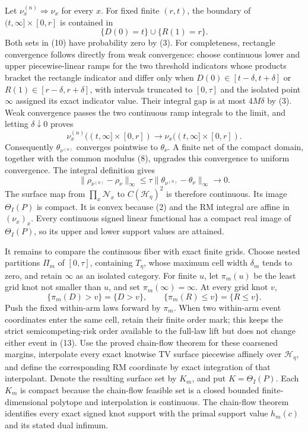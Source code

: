 Let \(\nu_x^{(n)}\Rightarrow\nu_x\) for every \(x\).  For fixed finite \((r,t)\), the boundary of \((t,\infty]\times[0,r]\) is contained in
\[
 \{D(0)=t\}\cup\{R(1)=r\}. \tag{10}
\]
Both sets in (10) have probability zero by (3).  For completeness, rectangle convergence follows directly from weak convergence: choose continuous lower and upper piecewise-linear ramps for the two threshold indicators whose products bracket the rectangle indicator and differ only when \(D(0)\in[t-\delta,t+\delta]\) or \(R(1)\in[r-\delta,r+\delta]\), with intervals truncated to \([0,\tau]\) and the isolated point \(\infty\) assigned its exact indicator value.  Their integral gap is at most \(4M\delta\) by (3).  Weak convergence passes the two continuous ramp integrals to the limit, and letting \(\delta\downarrow0\) proves
\[
 \nu_x^{(n)}((t,\infty]\times[0,r])
 \longrightarrow \nu_x((t,\infty]\times[0,r]). \tag{11}
\]
Consequently \(\theta_{\nu^{(n)}}\) converges pointwise to \(\theta_\nu\).  A finite net of the compact domain, together with the common modulus (8), upgrades this convergence to uniform convergence.  The integral definition gives
\[
 \|\rho_{\nu^{(n)}}-\rho_\nu\|_\infty
 \leq \tau\|\theta_{\nu^{(n)}}-\theta_\nu\|_\infty\longrightarrow0. \tag{12}
\]
The surface map from \(\prod_x\mathcal N_x\) to \(C(\mathcal H_\eta)^2\) is therefore continuous.  Its image \(\Theta_I(P)\) is compact.  It is convex because (2) and the RM integral are affine in \((\nu_x)_x\).  Every continuous signed linear functional has a compact real image of \(\Theta_I(P)\), so its upper and lower support values are attained.

It remains to compare the continuous fiber with exact finite grids.  Choose nested partitions \(\Pi_m\) of \([0,\tau]\), containing \(T_\eta\), whose maximum cell width \(\delta_m\) tends to zero, and retain \(\infty\) as an isolated category.  For finite \(u\), let \(\pi_m(u)\) be the least grid knot not smaller than \(u\), and set \(\pi_m(\infty)=\infty\).  At every grid knot \(v\),
\[
 \{\pi_m(D)>v\}=\{D>v\},
 \qquad
 \{\pi_m(R)\leq v\}=\{R\leq v\}. \tag{13}
\]
Push the fixed within-arm laws forward by \(\pi_m\).  When two within-arm event coordinates enter the same cell, retain their finite order mark; this keeps the strict semicompeting-risk order available to the full-law lift but does not change either event in (13).  Use the proved chain-flow theorem for these coarsened margins, interpolate every exact knotwise TV surface piecewise affinely over \(\mathcal H_\eta\), and define the corresponding RM coordinate by exact integration of that interpolant.  Denote the resulting surface set by \(K_m\), and put \(K=\Theta_I(P)\).  Each \(K_m\) is compact because the chain-flow feasible set is a closed bounded finite-dimensional polytope and interpolation is continuous.  The chain-flow theorem identifies every exact signed knot support with the primal support value \(h_m(c)\) and its stated dual infimum.

